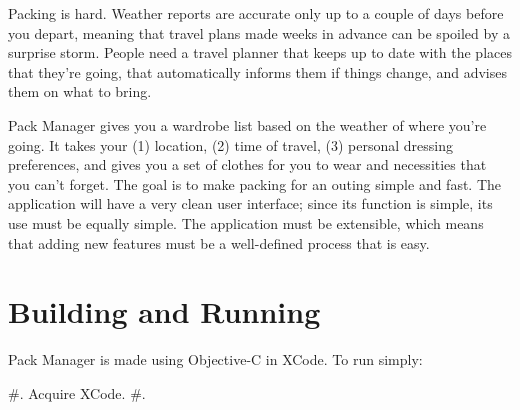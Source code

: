 Packing is hard. Weather reports are accurate only up to a couple of days before you depart, meaning that travel plans made weeks in advance can be spoiled by a surprise storm. People need a travel planner that keeps up to date with the places that they're going, that automatically informs them if things change, and advises them on what to bring.

Pack Manager gives you a wardrobe list based on the weather of where you're going. It takes your (1) location, (2) time of travel, (3) personal dressing preferences, and gives you a set of clothes for you to wear and necessities that you can't forget. The goal is to make packing for an outing simple and fast. The application will have a very clean user interface; since its function is simple, its use must be equally simple. The application must be extensible, which means that adding new features must be a well-\/defined process that is easy.

\section*{Building and Running}

Pack Manager is made using Objective-\/\-C in X\-Code. To run simply\-:

\#. Acquire X\-Code. \#. 